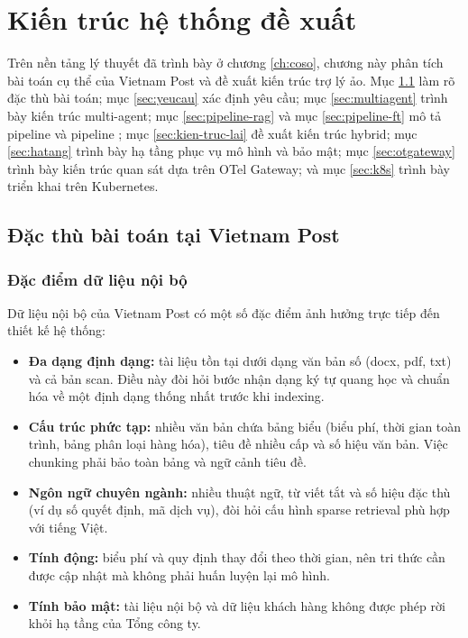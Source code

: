 \chapter{Kiến trúc hệ thống đề xuất}
\label{ch:kientruc}

Trên nền tảng lý thuyết đã trình bày ở chương \ref{ch:coso}, chương này phân tích bài toán
cụ thể của Vietnam Post và đề xuất kiến trúc trợ lý ảo. Mục \ref{sec:baigtoan} làm rõ đặc thù
bài toán; mục \ref{sec:yeucau} xác định yêu cầu; mục \ref{sec:multiagent} trình bày kiến
trúc multi-agent; mục \ref{sec:pipeline-rag} và mục \ref{sec:pipeline-ft} mô tả pipeline
\rag{} và pipeline \ft; mục \ref{sec:kien-truc-lai} đề xuất kiến trúc hybrid; mục
\ref{sec:hatang} trình bày hạ tầng phục vụ mô hình và bảo mật; mục \ref{sec:otgateway}
trình bày kiến trúc quan sát dựa trên OTel Gateway; và mục \ref{sec:k8s} trình bày triển
khai trên Kubernetes.

\section{Đặc thù bài toán tại Vietnam Post}
\label{sec:baigtoan}

\subsection{Đặc điểm dữ liệu nội bộ}

Dữ liệu nội bộ của Vietnam Post có một số đặc điểm ảnh hưởng trực tiếp đến thiết kế hệ thống:

\begin{itemize}
  \item \textbf{Đa dạng định dạng:} tài liệu tồn tại dưới dạng văn bản số (docx, pdf, txt)
  và cả bản scan. Điều này đòi hỏi bước nhận dạng ký tự quang học và chuẩn hóa về một định
  dạng thống nhất trước khi indexing.
  \item \textbf{Cấu trúc phức tạp:} nhiều văn bản chứa bảng biểu (biểu phí, thời gian toàn
  trình, bảng phân loại hàng hóa), tiêu đề nhiều cấp và số hiệu văn bản. Việc chunking
  phải bảo toàn bảng và ngữ cảnh tiêu đề.
  \item \textbf{Ngôn ngữ chuyên ngành:} nhiều thuật ngữ, từ viết tắt và số hiệu đặc thù
  (ví dụ số quyết định, mã dịch vụ), đòi hỏi cấu hình sparse retrieval phù hợp với tiếng Việt.
  \item \textbf{Tính động:} biểu phí và quy định thay đổi theo thời gian, nên tri thức cần
  được cập nhật mà không phải huấn luyện lại mô hình.
  \item \textbf{Tính bảo mật:} tài liệu nội bộ và dữ liệu khách hàng không được phép rời
  khỏi hạ tầng của Tổng công ty.
\end{itemize}

